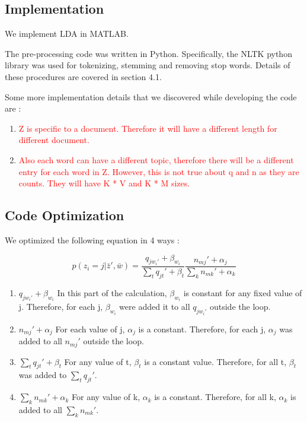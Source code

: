 \documentclass[11pt,a4paper,oneside]{article}
\def\red{\textcolor{red}}
\begin{document}
\subsection{Implementation}
We implement LDA in \textsc{MATLAB}.

The pre-processing code was written in Python. Specifically, the NLTK python library was used for tokenizing, stemming and removing stop words. Details of these procedures are covered in section 4.1.

Some more implementation details that we discovered while developing the code are :

\begin{enumerate}
  \item \red{Z is specific to a document. Therefore it will have a different length for different document.}
  \item \red{Also each word can have a different topic, therefore there will be a different entry for each word in Z. However, this is not true about q and n as they are counts. They will have K * V and K * M sizes.}
\end{enumerate}

\subsection{Code Optimization}
We optimized the following equation in 4 ways :

\begin{equation}
p(z_i = j | \bar{z}', \bar{w}) = \frac{q_{j w_{i}'} + \beta_{w_i}}{\sum_t{q_{jt}' + \beta_t}}\frac{n_{mj}' + \alpha_j}{\sum_k{n_{mk}' + \alpha_k}}
\end{equation}

\begin{enumerate}
\item $q_{j w_{i}'}+\beta_{w_i}$ In this part of the calculation, $\beta_{w_i}$ is constant for any fixed value of j. Therefore, for each j, $\beta_{w_i}$ were added it to all $q_{j w_{i}'}$ outside the loop. 
\item $n_{mj}' + \alpha_j$ For each value of j, $\alpha_j$ is a constant. Therefore, for each j, $\alpha_j$ was added to all $n_{mj}'$ outside the loop.
\item $\sum_t{q_{jt}' + \beta_t}$ For any value of t, $\beta_t$ is a constant value. Therefore, for all t, $\beta_t$ was added to $\sum_t{q_{jt}}'$.
\item $\sum_k{n_{mk}' + \alpha_k}$ For any value of k, $\alpha_k$ is a constant. Therefore, for all k, $\alpha_k$ is added to all $\sum_k{n_{mk}}'$.
\end{enumerate}
\end{document}
